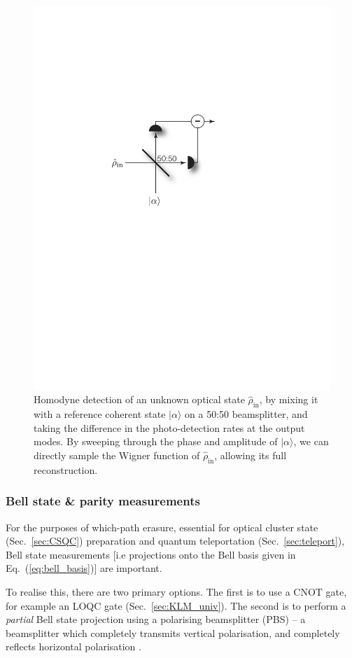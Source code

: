 \documentclass[aps, rmp, twocolumn, amsmath, amssymb, nofootinbib, superscriptaddress, longbibliography, floatfix, table-of-contents, eqsecnum]{revtex4-1}
\newcommand{\ket}[1]{|#1\rangle}
\begin{document}
\begin{figure}[!htb]
\includegraphics[width=0.6\columnwidth]{homodyne}
\caption{Homodyne detection of an unknown optical state $\hat\rho_\text{in}$, by mixing it with a reference coherent state $\ket\alpha$ on a 50:50 beamsplitter, and taking the difference in the photo-detection rates at the output modes. By sweeping through the phase and amplitude of $\ket\alpha$, we can directly sample the Wigner function of $\hat\rho_\text{in}$, allowing its full reconstruction.} \label{fig:homodyne}
\end{figure}


%
%

\subsubsection{Bell state \& parity measurements} \label{sec:bell_proj} 

For the purposes of which-path erasure, essential for optical cluster state (Sec.~\ref{sec:CSQC}) preparation and quantum teleportation (Sec.~\ref{sec:teleport}), Bell state measurements [i.e projections onto the Bell basis given in Eq.~(\ref{eq:bell_basis})] are important.

To realise this, there are two primary options. The first is to use a CNOT gate, for example an LOQC gate (Sec.~\ref{sec:KLM_univ}). The second is to perform a \textit{partial} Bell state projection using a polarising beamsplitter (PBS) -- a beamsplitter which completely transmits vertical polarisation, and completely reflects horizontal polarisation \cite{bib:BraunsteinMann95}.
\end{document}
